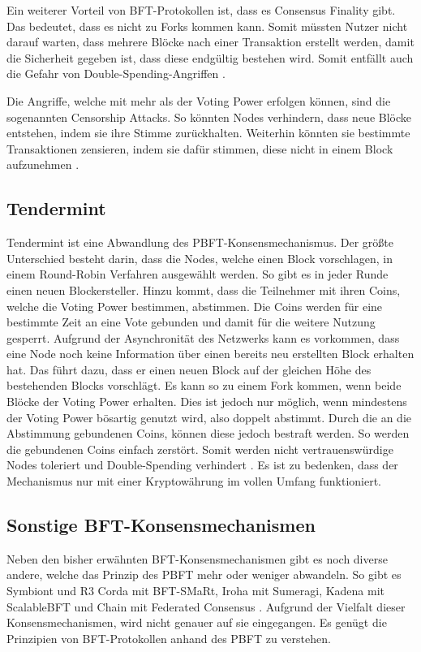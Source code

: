 Ein weiterer Vorteil von \acs{BFT}-Protokollen ist, dass es Consensus Finality gibt. Das bedeutet, dass es nicht zu Forks kommen kann. Somit müssten Nutzer nicht darauf warten, dass mehrere Blöcke nach einer Transaktion erstellt werden, damit die Sicherheit gegeben ist, dass diese endgültig bestehen wird. Somit entfällt auch die Gefahr von Double-Spending-Angriffen \cite{Vukolicquestscalableblockchain2015}.

Die Angriffe, welche mit mehr als  der Voting Power erfolgen können, sind die sogenannten Censorship Attacks. So könnten Nodes verhindern, dass neue Blöcke entstehen, indem sie ihre Stimme zurückhalten. Weiterhin könnten sie bestimmte Transaktionen zensieren, indem sie dafür stimmen, diese nicht in einem Block aufzunehmen \cite{TendermintTeamTendermintGithubRepository2018}.

\subsection{Tendermint}
Tendermint ist eine Abwandlung des \acs{PBFT}-Konsensmechanismus. Der größte Unterschied besteht darin, dass die Nodes, welche einen Block vorschlagen, in einem Round-Robin Verfahren ausgewählt werden. So gibt es in jeder Runde einen neuen Blockersteller. Hinzu kommt, dass die Teilnehmer mit ihren Coins, welche die Voting Power bestimmen, abstimmen. Die Coins werden für eine bestimmte Zeit an eine Vote gebunden und damit für die weitere Nutzung gesperrt. Aufgrund der Asynchronität des Netzwerks kann es vorkommen, dass eine Node noch keine Information über einen bereits neu erstellten Block erhalten hat. Das führt dazu, dass er einen neuen Block auf der gleichen Höhe des bestehenden Blocks vorschlägt. Es kann so zu einem Fork kommen, wenn beide Blöcke  der Voting Power erhalten. Dies ist jedoch nur möglich, wenn mindestens  der Voting Power bösartig genutzt wird, also doppelt abstimmt. Durch die an die Abstimmung gebundenen Coins, können diese jedoch bestraft werden. So werden die gebundenen Coins einfach zerstört. Somit werden nicht vertrauenswürdige Nodes toleriert und Double-Spending verhindert \cite{KwonTendermintConsensusmining2014}\cite{BuchmanTendermintByzantineFault2016}. Es ist zu bedenken, dass der Mechanismus nur mit einer Kryptowährung im vollen Umfang funktioniert.

\subsection{Sonstige BFT-Konsensmechanismen}
Neben den bisher erwähnten \acs{BFT}-Konsensmechanismen gibt es noch diverse andere, welche das Prinzip des \acs{PBFT} mehr oder weniger abwandeln. So gibt es Symbiont und R3 Corda mit BFT-SMaRt, Iroha mit Sumeragi, Kadena mit ScalableBFT und Chain mit Federated Consensus \cite{CachinBlockchainConsensusProtocols2017}. Aufgrund der Vielfalt dieser Konsensmechanismen, wird nicht genauer auf sie eingegangen. Es genügt die Prinzipien von \acs{BFT}-Protokollen anhand des \acs{PBFT} zu verstehen.

